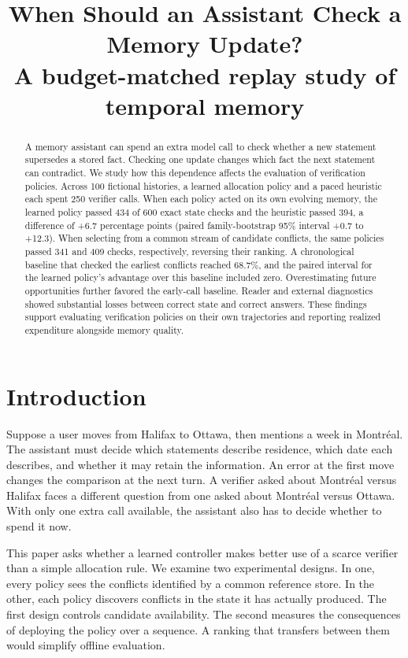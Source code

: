 \documentclass[11pt]{article}
\title{When Should an Assistant Check a Memory Update?\\[.4em]\large A budget-matched replay study of temporal memory}
\author{}
\date{}
\begin{document}
\maketitle
\nocite{rasmussen2025zep,xu2025amem,dhuliawala2024cove,wu2025longmemeval,tracemem,uddin2026memora}

\begin{abstract}

A memory assistant can spend an extra model call to check whether a new statement supersedes a stored fact. Checking one update changes which fact the next statement can contradict. We study how this dependence affects the evaluation of verification policies. Across 100 fictional histories, a learned allocation policy and a paced heuristic each spent 250 verifier calls. When each policy acted on its own evolving memory, the learned policy passed 434 of 600 exact state checks and the heuristic passed 394, a difference of +6.7 percentage points (paired family-bootstrap 95\% interval +0.7 to +12.3). When selecting from a common stream of candidate conflicts, the same policies passed 341 and 409 checks, respectively, reversing their ranking. A chronological baseline that checked the earliest conflicts reached 68.7\%, and the paired interval for the learned policy’s advantage over this baseline included zero. Overestimating future opportunities further favored the early-call baseline. Reader and external diagnostics showed substantial losses between correct state and correct answers. These findings support evaluating verification policies on their own trajectories and reporting realized expenditure alongside memory quality.

\end{abstract}

\section{Introduction}

Suppose a user moves from Halifax to Ottawa, then mentions a week in Montréal. The assistant must decide which statements describe residence, which date each describes, and whether it may retain the information. An error at the first move changes the comparison at the next turn. A verifier asked about Montréal versus Halifax faces a different question from one asked about Montréal versus Ottawa. With only one extra call available, the assistant also has to decide whether to spend it now.

This paper asks whether a learned controller makes better use of a scarce verifier than a simple allocation rule. We examine two experimental designs. In one, every policy sees the conflicts identified by a common reference store. In the other, each policy discovers conflicts in the state it has actually produced. The first design controls candidate availability. The second measures the consequences of deploying the policy over a sequence. A ranking that transfers between them would simplify offline evaluation.
\end{document}
